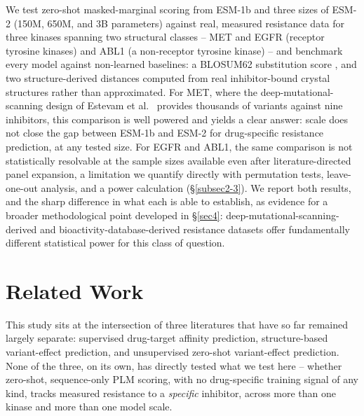 \documentclass[pdflatex,sn-mathphys-num]{sn-jnl}%
\theoremstyle{thmstyleone}%
\theoremstyle{thmstyletwo}%
\theoremstyle{thmstylethree}%
\begin{document}
We test zero-shot masked-marginal scoring \citep{Meier2021} from ESM-1b and three sizes of ESM-2 (150M, 650M, and 3B parameters) against real, measured resistance data for three kinases spanning two structural classes -- MET and EGFR (receptor tyrosine kinases) and ABL1 (a non-receptor tyrosine kinase) -- and benchmark every model against non-learned baselines: a BLOSUM62 substitution score \citep{Henikoff1992}, and two structure-derived distances computed from real inhibitor-bound crystal structures rather than approximated. For MET, where the deep-mutational-scanning design of Estevam et al.\ \citep{Estevam2025} provides thousands of variants against nine inhibitors, this comparison is well powered and yields a clear answer: scale does not close the gap between ESM-1b and ESM-2 for drug-specific resistance prediction, at any tested size. For EGFR and ABL1, the same comparison is not statistically resolvable at the sample sizes available even after literature-directed panel expansion, a limitation we quantify directly with permutation tests, leave-one-out analysis, and a power calculation (\S\ref{subsec2-3}). We report both results, and the sharp difference in what each is able to establish, as evidence for a broader methodological point developed in \S\ref{sec4}: deep-mutational-scanning-derived and bioactivity-database-derived resistance datasets offer fundamentally different statistical power for this class of question.

\section{Related Work}\label{secRW}

This study sits at the intersection of three literatures that have so far remained largely separate: supervised drug-target affinity prediction, structure-based variant-effect prediction, and unsupervised zero-shot variant-effect prediction. None of the three, on its own, has directly tested what we test here -- whether zero-shot, sequence-only PLM scoring, with no drug-specific training signal of any kind, tracks measured resistance to a \emph{specific} inhibitor, across more than one kinase and more than one model scale.
\end{document}
